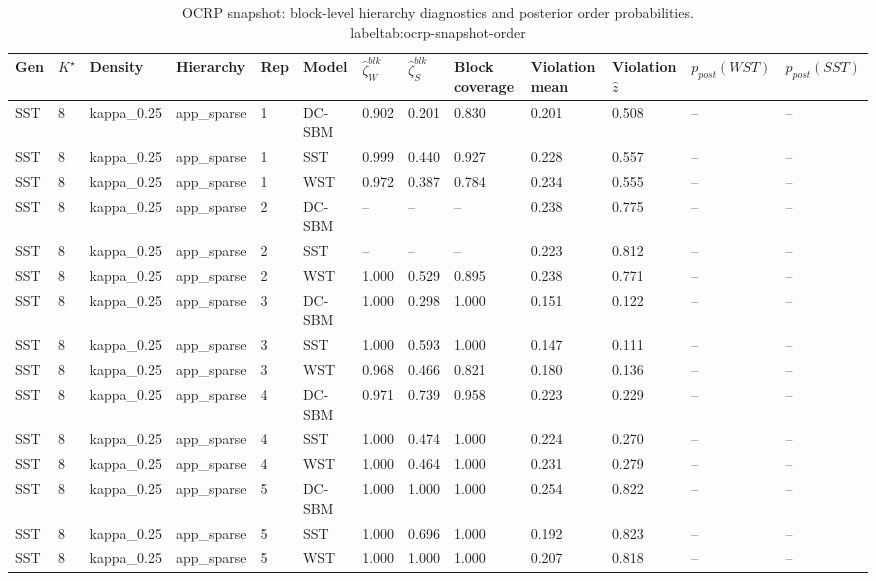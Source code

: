 \begin{table}[!h]
\centering
\caption{OCRP snapshot: block-level hierarchy diagnostics and posterior order probabilities.\\label{tab:ocrp-snapshot-order}}
\centering
\begin{tabular}[t]{lllllllllllll}
\toprule
Gen & $K^\star$ & Density & Hierarchy & Rep & Model & $\widehat\zeta_W^{blk}$ & $\widehat\zeta_S^{blk}$ & Block coverage & Violation mean & Violation $\hat z$ & $p_{post}(WST)$ & $p_{post}(SST)$\\
\midrule
SST & 8 & kappa_0.25 & app_sparse & 1 & DC-SBM & 0.902 & 0.201 & 0.830 & 0.201 & 0.508 & -- & --\\
SST & 8 & kappa_0.25 & app_sparse & 1 & SST & 0.999 & 0.440 & 0.927 & 0.228 & 0.557 & -- & --\\
SST & 8 & kappa_0.25 & app_sparse & 1 & WST & 0.972 & 0.387 & 0.784 & 0.234 & 0.555 & -- & --\\
SST & 8 & kappa_0.25 & app_sparse & 2 & DC-SBM & -- & -- & -- & 0.238 & 0.775 & -- & --\\
SST & 8 & kappa_0.25 & app_sparse & 2 & SST & -- & -- & -- & 0.223 & 0.812 & -- & --\\
SST & 8 & kappa_0.25 & app_sparse & 2 & WST & 1.000 & 0.529 & 0.895 & 0.238 & 0.771 & -- & --\\
SST & 8 & kappa_0.25 & app_sparse & 3 & DC-SBM & 1.000 & 0.298 & 1.000 & 0.151 & 0.122 & -- & --\\
SST & 8 & kappa_0.25 & app_sparse & 3 & SST & 1.000 & 0.593 & 1.000 & 0.147 & 0.111 & -- & --\\
SST & 8 & kappa_0.25 & app_sparse & 3 & WST & 0.968 & 0.466 & 0.821 & 0.180 & 0.136 & -- & --\\
SST & 8 & kappa_0.25 & app_sparse & 4 & DC-SBM & 0.971 & 0.739 & 0.958 & 0.223 & 0.229 & -- & --\\
SST & 8 & kappa_0.25 & app_sparse & 4 & SST & 1.000 & 0.474 & 1.000 & 0.224 & 0.270 & -- & --\\
SST & 8 & kappa_0.25 & app_sparse & 4 & WST & 1.000 & 0.464 & 1.000 & 0.231 & 0.279 & -- & --\\
SST & 8 & kappa_0.25 & app_sparse & 5 & DC-SBM & 1.000 & 1.000 & 1.000 & 0.254 & 0.822 & -- & --\\
SST & 8 & kappa_0.25 & app_sparse & 5 & SST & 1.000 & 0.696 & 1.000 & 0.192 & 0.823 & -- & --\\
SST & 8 & kappa_0.25 & app_sparse & 5 & WST & 1.000 & 1.000 & 1.000 & 0.207 & 0.818 & -- & --\\

\end{tabular}
\end{table}
